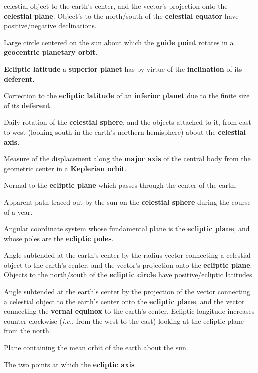 {\begin{description}
celestial object to the earth's center, and the vector's projection onto the {\bf celestial
plane}. Object's to the north/south of the {\bf celestial
equator}\/ have positive/negative declinations.
\item[Deferent:] Large circle centered on the sun about which the {\bf guide
point} rotates in a {\bf geocentric planetary orbit}.
\item[Deferential Latitude:] {\bf Ecliptic latitude}\/ a {\bf superior planet}\/
has by virtue of the {\bf inclination}\/ of its {\bf deferent}. 
\item[Deferential Latitude Correction Factor:] Correction to the {\bf ecliptic
latitude}\/ of an {\bf inferior planet}\/ due to the finite size of its {\bf deferent}. 
\item [Diurnal Motion:] Daily rotation of the {\bf celestial sphere},
and the objects attached to it, from east to west (looking south in the earth's
northern hemisphere) about the {\bf celestial axis}.
\item [Eccentricity:] Measure of the displacement  along the {\bf major axis}\/ of the central body from the
geometric center in  a {\bf Keplerian orbit}. 
\item [Ecliptic Axis:] Normal to the {\bf ecliptic plane}\/ which
passes through the center of the earth.
\item [Ecliptic Circle:] Apparent path traced out by the sun on the {\bf celestial sphere}\/
during the course of a year.
\item [Ecliptic Coordinates:] Angular coordinate system whose fundamental
plane is the
{\bf ecliptic plane}, and whose poles are the {\bf ecliptic poles}. 
\item[Ecliptic Latitude:] Angle subtended at the earth's center by the radius vector connecting a
celestial object to the earth's center, and the vector's projection onto the {\bf ecliptic
plane}. Objects to the north/south of the {\bf ecliptic circle}\/ have positive/ecliptic latitudes.
\item [Ecliptic Longitude:] Angle subtended at the earth's center by the projection
of the vector connecting a celestial object to the earth's center
onto the {\bf ecliptic plane}, and the vector connecting the
{\bf vernal equinox}\/ to the earth's center. Ecliptic longitude increases counter-clockwise ({\em i.e.}, from the west to the east) looking at the
ecliptic plane from the north.
\item [Ecliptic Plane:] Plane containing the mean orbit of the earth
about the sun.
\item [Ecliptic Poles:] The two points at which the {\bf ecliptic axis}\/

\end{description}}
